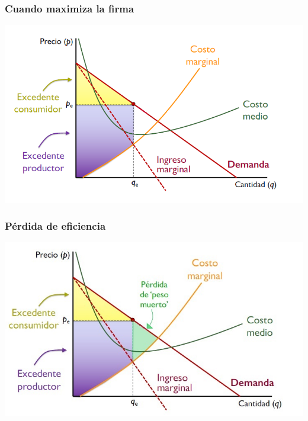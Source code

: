 \documentclass{beamer}
\begin{document}
\begin{frame}
\frametitle{Cuando maximiza la firma}
\includegraphics[scale=0.6]{../Figures/Tema_06.41_excedente4.png}
\end{frame}

\begin{frame}
\frametitle{Pérdida de eficiencia}
\includegraphics[scale=0.6]{../Figures/Tema_06.42_excedente5.jpg}
\end{frame}
\end{document}
